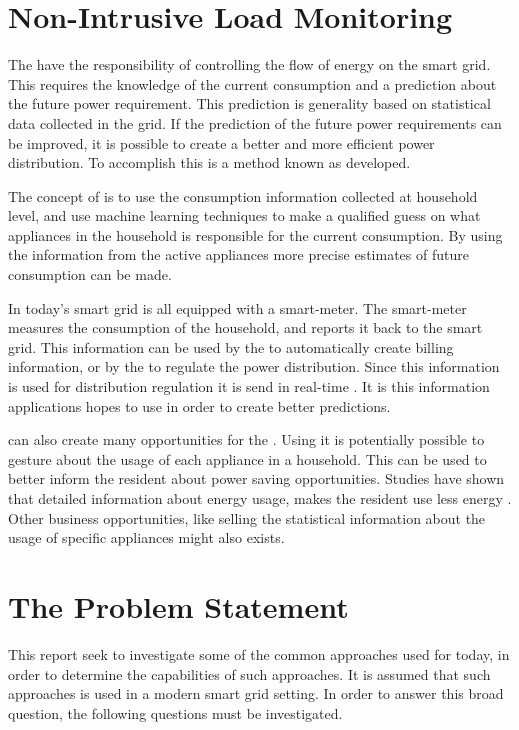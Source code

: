 \newpage
\section{Non-Intrusive Load Monitoring}
The  have the responsibility of controlling the flow of energy on the smart grid. This requires the knowledge of the current consumption and a prediction about the future power requirement. This prediction is generality based on statistical data collected in the grid. If the prediction of the future power requirements can be improved, it is possible to create a better and more efficient power distribution. To accomplish this is a method known as  developed.

The concept of  is to use the consumption information collected at household level, and use machine learning techniques to make a qualified guess on what appliances in the household is responsible for the current consumption. By using the information from the active appliances more precise estimates of future consumption can be made. 

In today's smart grid is all  equipped with a smart-meter. The smart-meter measures the consumption of the household, and reports it back to the smart grid. This information can be used by the  to automatically create billing information, or by the  to regulate the power distribution. Since this information is used for distribution regulation it is send in real-time \citep{RefWorks:41}. It is this information  applications hopes to use in order to create better predictions.

 can also create many opportunities for the . Using  it is potentially possible to gesture about the usage of each appliance in a household. This can be used to better inform the resident about power saving opportunities. Studies have shown that detailed information about energy usage, makes the resident use less energy \citep{RefWorks:33}. Other business opportunities, like selling the statistical information about the usage of specific appliances might also exists.  

\section{The Problem Statement}

This report seek to investigate some of the common approaches used for  today, in order to determine the capabilities of such approaches. It is assumed that such approaches is used in a modern smart grid setting. In order to answer this broad question, the following questions must be investigated. 

